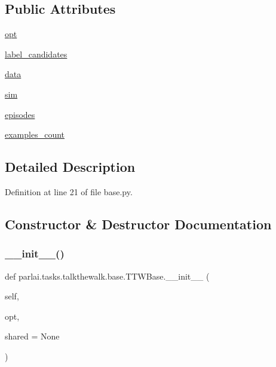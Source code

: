 \subsection*{Public Attributes}
\begin{DoxyCompactItemize}
\item 
\hyperlink{classparlai_1_1tasks_1_1talkthewalk_1_1base_1_1TTWBase_aa716b1fde5dd6d0409ff111df962067e}{opt}
\item 
\hyperlink{classparlai_1_1tasks_1_1talkthewalk_1_1base_1_1TTWBase_a66874e232187d869705096b64775448e}{label\+\_\+candidates}
\item 
\hyperlink{classparlai_1_1tasks_1_1talkthewalk_1_1base_1_1TTWBase_a3080a626f294ef819e26aedb322ee99a}{data}
\item 
\hyperlink{classparlai_1_1tasks_1_1talkthewalk_1_1base_1_1TTWBase_a723ca7277cb3040cbfef0d9ef3161df3}{sim}
\item 
\hyperlink{classparlai_1_1tasks_1_1talkthewalk_1_1base_1_1TTWBase_a0c6f24b6c2fa6e69d28606ac2cabab01}{episodes}
\item 
\hyperlink{classparlai_1_1tasks_1_1talkthewalk_1_1base_1_1TTWBase_a6d2d68b1aba27c50ce67efc0c0f07dc4}{examples\+\_\+count}
\end{DoxyCompactItemize}


\subsection{Detailed Description}


Definition at line 21 of file base.\+py.



\subsection{Constructor \& Destructor Documentation}
\mbox{\label{classparlai_1_1tasks_1_1talkthewalk_1_1base_1_1TTWBase_abde7fa2ca98467601795e5873285d8a0}} 
\subsubsection{\texorpdfstring{\+\_\+\+\_\+init\+\_\+\+\_\+()}{\_\_init\_\_()}}
{\footnotesize\ttfamily def parlai.\+tasks.\+talkthewalk.\+base.\+T\+T\+W\+Base.\+\_\+\+\_\+init\+\_\+\+\_\+ (\begin{DoxyParamCaption}\item[{}]{self,  }\item[{}]{opt,  }\item[{}]{shared = {\ttfamily None} }\end{DoxyParamCaption})}



